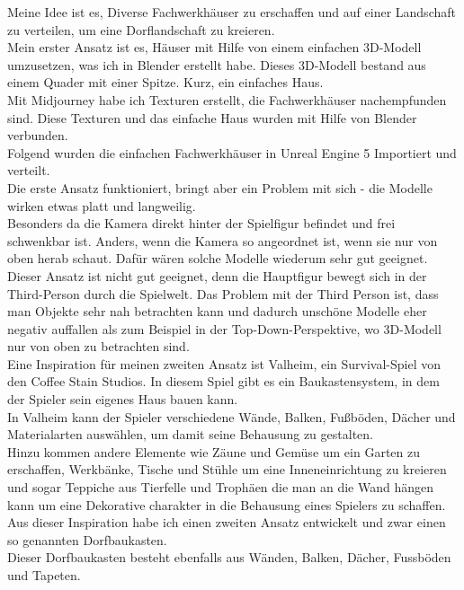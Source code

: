 \documentclass[12pt,a4paper,bibliography=totocnumbered,listof=totocnumbered]{scrartcl}
\begin{document}
Meine Idee ist es, Diverse Fachwerkhäuser zu erschaffen und auf einer Landschaft zu verteilen, um eine Dorflandschaft zu kreieren.
\\
Mein erster Ansatz ist es, Häuser mit Hilfe von einem einfachen 3D-Modell umzusetzen, was ich in Blender erstellt habe. Dieses 3D-Modell bestand aus einem Quader mit einer Spitze. Kurz, ein einfaches Haus.
\\
Mit Midjourney habe ich Texturen erstellt, die Fachwerkhäuser nachempfunden sind. Diese Texturen und das einfache Haus wurden mit Hilfe von Blender verbunden. 
\\
Folgend wurden die einfachen Fachwerkhäuser in Unreal Engine 5 Importiert und verteilt.
\\
Die erste Ansatz funktioniert, bringt aber ein Problem mit sich - die Modelle wirken etwas platt und langweilig. 
\\
Besonders da die Kamera direkt hinter der Spielfigur befindet und frei schwenkbar ist. Anders, wenn die Kamera so angeordnet ist, wenn sie nur von oben herab schaut. Dafür wären solche Modelle wiederum sehr gut geeignet.
\\
Dieser Ansatz ist nicht gut geeignet, denn die Hauptfigur bewegt sich in der Third-Person durch die Spielwelt. Das Problem mit der Third Person ist, dass man Objekte sehr nah betrachten kann und dadurch unschöne Modelle eher  negativ auffallen als zum Beispiel in der Top-Down-Perspektive, wo 3D-Modell nur von oben zu betrachten sind.
\\
Eine Inspiration für meinen zweiten Ansatz ist Valheim, ein Survival-Spiel von den Coffee Stain Studios. In diesem Spiel gibt es ein Baukastensystem, in dem der Spieler sein eigenes Haus bauen kann.
\\
In Valheim kann der Spieler verschiedene Wände, Balken, Fußböden, Dächer und Materialarten auswählen, um damit seine Behausung zu gestalten.
\\
Hinzu kommen andere Elemente wie Zäune und Gemüse um ein Garten zu erschaffen, Werkbänke, Tische und Stühle um eine Inneneinrichtung zu kreieren und sogar Teppiche aus Tierfelle und Trophäen die man an die Wand hängen kann um eine Dekorative charakter in die Behausung eines Spielers zu schaffen.
\\
Aus dieser Inspiration habe ich einen zweiten Ansatz entwickelt und zwar einen so genannten Dorfbaukasten.
\\
Dieser Dorfbaukasten besteht ebenfalls aus Wänden, Balken, Dächer, Fussböden und Tapeten.
\\
\end{document}
